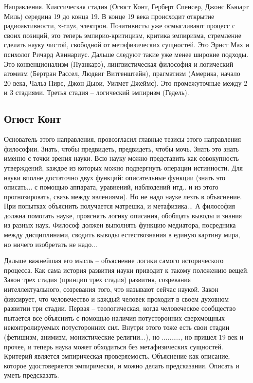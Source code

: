 \documentclass[a4paper, 12pt]{article}
\begin{document}
Направления. Классическая стадия (Огюст Конт, Герберт Спенсер, Джонс 
Кьюарт Миль) середина 19 до конца 19. В конце 19 века происходит 
открытие радиоактивности, x-rays, электрон. Позитивисты уже осмысливают 
процесс с своих позиций, это теперь эмпирио-критицизм, критика 
эмпиризма, стремление сделать науку чистой, свободной от метафизических 
сущностей. Это Эрнст Мах и психолог Ричард Авинариус. Дальше следуют 
такие уже менее широкие подходы. Это конвенционализм (Пуанкарэ), 
лингвистическая философия и логический атомизм (Бертран Рассел, Людвиг 
Витгенштейн), прагматизм (Америка, начало 20 века, Чальз Пирс, Джон 
Дьюи, Уилмет Джеймс). Это промежуточные между 2 и 3 стадиями. Третья 
стадия -- логический эмпиризм (Гедель).


\subsection{Огюст Конт}

Основатель этого направления, провозгласил главные тезисы этого 
направления философии. Знать, чтобы предвидеть, предвидеть, чтобы мочь. 
Знать это знать именно с точки зрения науки. Всю науку можно представить 
как совокупность утверждений, каждое из которых можно подвергнуть 
операции истинности. Для науки вполне достаточно двух функций: 
описательные функции (знать это описать... с помощью аппарата, 
уравнений, наблюдений итд.. и из этого прогнозировать, связь между 
явлениями). Но не надо науке лезть в объяснение. При попытках объяснить 
получается матрешка, и метафизика... А философия должна помогать науке, 
прояснять логику описания, обобщать выводы и знания из разных наук. 
Философ должен выполнять функцию медиатора, посредника между 
дисциплинами, сводить выводы естествознания в единую картину мира, но 
ничего изобретать не надо...

Дальше важнейшая его мысль -- объяснение логики самого исторического 
процесса. Как сама история развития науки приводит к такому положению 
вещей. Закон трех стадия (принцип трех стадия) развития, созревания 
интеллектуального, созревания того, что называют сейчас наукой. Закон 
фиксирует, что человечество и каждый человек проходит в своем духовном 
развитии три стадии. Первая -- теологическая, когда человеческое 
сообщество пытается все объяснить с помощью наличия потусторонних 
сверхмощных неконтролируемых потусторонних сил. Внутри этого тоже есть 
свои стадии (фетишизм, анимизм, монистические религии...), но 
.........., но пришел 19 век и прочее, и теперь наука может обходиться 
без метафизических сущностей. Критерий является эмпирическая 
проверяемость. Объяснение как описание, которое удостоверяется 
эмпирически, и можно делать предсказания. Описать и уметь предсказать.
\end{document}
